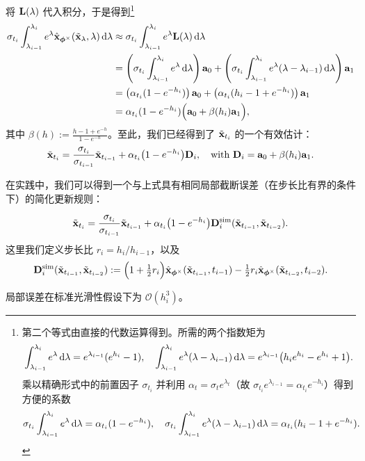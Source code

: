 将 ${\mathbf{L}}(\lambda)$ 代入积分，于是得到\footnote{第二个等式由直接的代数运算得到。所需的两个指数矩为
\[
\int_{\lambda_{i-1}}^{\lambda_i}  e^\lambda \mathop{}\!\mathrm{d}\lambda=e^{\lambda_{i-1}}(e^{h_i}-1),
\quad
\int_{\lambda_{i-1}}^{\lambda_i}  e^\lambda(\lambda-\lambda_{i-1}) \mathop{}\!\mathrm{d}\lambda
=e^{\lambda_{i-1}} \big(h_i e^{h_i}-e^{h_i}+1\big).
\]
乘以精确形式中的前置因子 $\sigma_{t_i}$ 并利用 $\alpha_t=\sigma_t e^{\lambda_t}$（故 $\sigma_{t_i}e^{\lambda_{i-1}}=\alpha_{t_i}e^{-h_i}$）得到方便的系数
\[
\sigma_{t_i} \int_{\lambda_{i-1}}^{\lambda_i} e^\lambda \mathop{}\!\mathrm{d}\lambda=\alpha_{t_i}(1-e^{-h_i}),
\quad
\sigma_{t_i} \int_{\lambda_{i-1}}^{\lambda_i} e^\lambda(\lambda-\lambda_{i-1}) \mathop{}\!\mathrm{d}\lambda=\alpha_{t_i}(h_i-1+e^{-h_i}).
\]}
\begin{align*}
\sigma_{t_i}\int_{\lambda_{i-1}}^{\lambda_i} e^\lambda \hat{{\mathbf{x}}}_{\bm{\phi}^\times}(\tilde{{\mathbf{x}}}_{\lambda},\lambda) \mathop{}\!\mathrm{d}\lambda
&\approx \sigma_{t_i}\int_{\lambda_{i-1}}^{\lambda_i} e^\lambda {\mathbf{L}}(\lambda) \mathop{}\!\mathrm{d}\lambda \\
&=\left(\sigma_{t_i}\int_{\lambda_{i-1}}^{\lambda_i} e^\lambda \mathop{}\!\mathrm{d}\lambda \right){\mathbf{a}}_0+\left(\sigma_{t_i}\int_{\lambda_{i-1}}^{\lambda_i} e^\lambda(\lambda-\lambda_{i-1}) \mathop{}\!\mathrm{d}\lambda \right) {\mathbf{a}}_1
\\&=\left(\alpha_{t_i}(1-e^{-h_i})\right){\mathbf{a}}_0+\left(\alpha_{t_i}(h_i-1+e^{-h_i}) \right) {\mathbf{a}}_1
\\&=\alpha_{t_i}(1-e^{-h_i})\Big({\mathbf{a}}_0+\beta(h_i)  {\mathbf{a}}_1\Big),
\end{align*}
其中 $\beta(h):=\frac{h-1+e^{-h}}{ 1-e^{-h} }$。至此，我们已经得到了 $\tilde{{\mathbf{x}}}_{t_i}$ 的一个有效估计：
\begin{equation*}
\tilde{{\mathbf{x}}}_{t_i}
=
\frac{\sigma_{t_i}}{\sigma_{t_{i-1}}} \tilde{{\mathbf{x}}}_{t_{i-1}}
 + 
\alpha_{t_i} \big(1-e^{-h_i}\big) {\mathbf{D}}_i,\quad\text{with } {\mathbf{D}}_i={\mathbf{a}}_0+\beta(h_i)  {\mathbf{a}}_1.
\end{equation*}


在实践中，我们可以得到一个与上式具有相同局部截断误差（在步长比有界的条件下）的简化更新规则：

\begin{mdframed}
\begin{align*}
\begin{aligned}
    \tilde{{\mathbf{x}}}_{t_i}=
\frac{\sigma_{t_i}}{\sigma_{t_{i-1}}} \tilde{{\mathbf{x}}}_{t_{i-1}}
+ 
\alpha_{t_i} \big(1-e^{-h_i}\big) {\mathbf{D}}_i^{\mathrm{sim}}(\tilde{{\mathbf{x}}}_{t_{i-1}}, \tilde{{\mathbf{x}}}_{t_{i-2}}).
\end{aligned}
\end{align*}
这里我们定义步长比 $r_i=h_i/h_{i-1}$，以及
\begin{align*}
    {\mathbf{D}}_i^{\mathrm{sim}}(\tilde{{\mathbf{x}}}_{t_{i-1}}, \tilde{{\mathbf{x}}}_{t_{i-2}})
    :=\Big(1+\tfrac12 r_i\Big) \hat{{\mathbf{x}}}_{\bm{\phi}^\times}(\tilde{{\mathbf{x}}}_{t_{i-1}},t_{i-1})
-\tfrac12 r_i \hat{{\mathbf{x}}}_{\bm{\phi}^\times}(\tilde{{\mathbf{x}}}_{t_{i-2}},t_{i-2}).
\end{align*}
\end{mdframed}
局部误差在标准光滑性假设下为 $\mathcal{O}(h_i^3)$。


